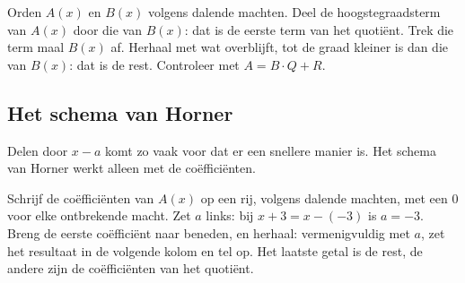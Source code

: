 \begin{werkwijze}
Orden $A(x)$ en $B(x)$ volgens dalende machten. Deel de hoogstegraadsterm van $A(x)$ door die van $B(x)$: dat is de eerste term van het quotiënt. Trek die term maal $B(x)$ af. Herhaal met wat overblijft, tot de graad kleiner is dan die van $B(x)$: dat is de rest. Controleer met $A = B \cdot Q + R$.
\end{werkwijze}

\begin{oefeningen}
\end{oefeningen}

\subsection{Het schema van Horner}

Delen door $x - a$ komt zo vaak voor dat er een snellere manier is. Het schema van Horner werkt alleen met de coëfficiënten.


\begin{werkwijze}
Schrijf de coëfficiënten van $A(x)$ op een rij, volgens dalende machten, met een $0$ voor elke ontbrekende macht. Zet $a$ links: bij $x + 3 = x - (-3)$ is $a = -3$. Breng de eerste coëfficiënt naar beneden, en herhaal: vermenigvuldig met $a$, zet het resultaat in de volgende kolom en tel op. Het laatste getal is de rest, de andere zijn de coëfficiënten van het quotiënt.
\end{werkwijze}

